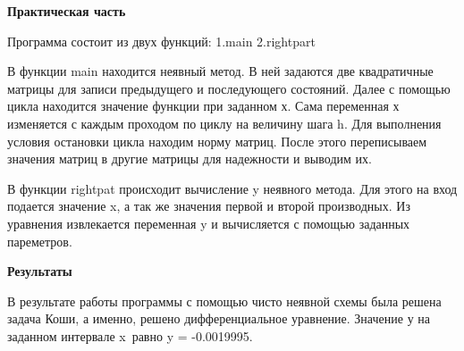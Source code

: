 \documentclass{article}
\begin{document}
\LARGE
\textbf{Практическая часть}
\Large

Программа состоит из двух функций:
1.main
2.rightpart

В функции main находится неявный метод. В ней задаются две квадратичные матрицы для записи предыдущего и последующего состояний.
 Далее с помощью цикла находится значение функции при заданном х. Сама переменная х изменяется с каждым проходом по циклу на величину шага h.
 Для выполнения условия остановки цикла находим норму матриц.
 После этого переписываем значения матриц в другие матрицы для надежности и выводим их.
 
В функции rightpat происходит вычисление y неявного метода. Для этого на вход подается значение x, а так же значения первой и второй производных.
 Из уравнения извлекается переменная y и вычисляется с помощью заданных пареметров.
 
\LARGE
\textbf{Результаты}
\Large

В результате работы программы с помощью чисто неявной схемы была решена задача Коши, а именно, решено дифференциальное уравнение.
Значение у на заданном интервале x\in [0,2]\ равно  y = -0.0019995.
\end{document}
